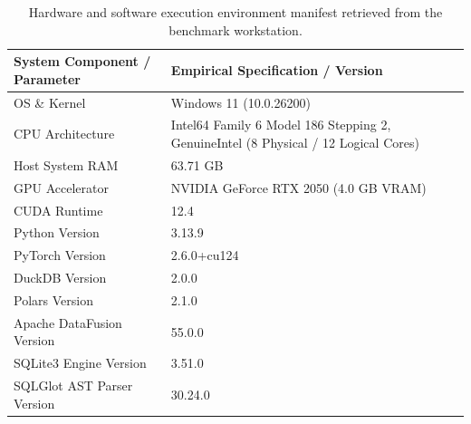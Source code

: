 \begin{table}[htbp]
\centering
\scriptsize
\setlength{\tabcolsep}{6.0pt}
\caption{Hardware and software execution environment manifest retrieved from the benchmark workstation.}
\label{tab:env_manifest}
\begin{tabular}{@{}ll@{}}
\toprule
\textbf{System Component / Parameter} & \textbf{Empirical Specification / Version} \\
\midrule
OS \& Kernel & Windows 11 (10.0.26200) \\
CPU Architecture & Intel64 Family 6 Model 186 Stepping 2, GenuineIntel (8 Physical / 12 Logical Cores) \\
Host System RAM & 63.71 GB \\
GPU Accelerator & NVIDIA GeForce RTX 2050 (4.0 GB VRAM) \\
CUDA Runtime & 12.4 \\
Python Version & 3.13.9 \\
PyTorch Version & 2.6.0+cu124 \\
DuckDB Version & 2.0.0 \\
Polars Version & 2.1.0 \\
Apache DataFusion Version & 55.0.0 \\
SQLite3 Engine Version & 3.51.0 \\
SQLGlot AST Parser Version & 30.24.0 \\
\bottomrule
\end{tabular}
\end{table}